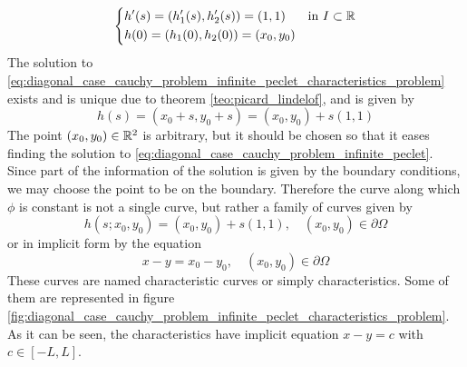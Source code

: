 \begin{equation} \label{eq:diagonal_case_cauchy_problem_infinite_peclet_characteristics_problem}
	\left\{
	\begin{aligned}
		&h'(s) = (h_1'(s), h_2'(s)) = (1, 1) & &\text{in } I \subset \mathbb{R} \\
		&h(0) = (h_1(0), h_2(0)) = (x_0, y_0)
	\end{aligned}
	\right.
\end{equation}
The solution to \eqref{eq:diagonal_case_cauchy_problem_infinite_peclet_characteristics_problem} exists and is unique due to theorem \ref{teo:picard_lindelof}, and is given by
\begin{equation}
	h(s) = (x_0 + s, y_0 + s) = (x_0, y_0) + s(1, 1)
\end{equation}
The point $(x_0, y_0) \in \mathbb{R}^2$ is arbitrary, but it should be chosen so that it eases finding the solution to \eqref{eq:diagonal_case_cauchy_problem_infinite_peclet}. Since part of the information of the solution is given by the boundary conditions, we may choose the point to be on the boundary. Therefore the curve along which $\phi$ is constant is not a single curve, but rather a family of curves given by
\begin{equation}
	h(s; x_0, y_0) = (x_0, y_0) + s(1, 1), \quad (x_0, y_0) \in \partial \Omega
\end{equation}
or in implicit form by the equation
\begin{equation} \label{eq:diagonal_case_cauchy_problem_infinite_peclet_characteristics_implicit_form}
	x - y = x_0 - y_0, \quad (x_0, y_0) \in \partial \Omega
\end{equation}
These curves are named characteristic curves or simply characteristics. Some of them are represented in figure \ref{fig:diagonal_case_cauchy_problem_infinite_peclet_characteristics_problem}. As it can be seen, the characteristics have implicit equation $x - y = c$ with $c \in [-L, L]$.

